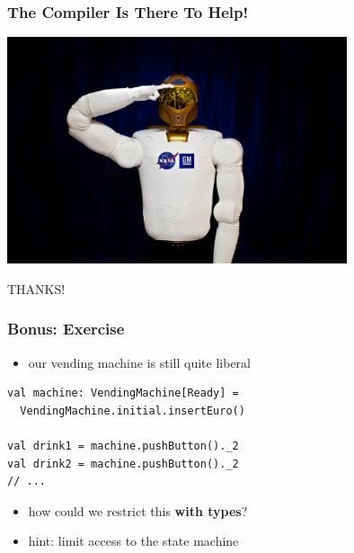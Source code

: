 \documentclass{beamer}
\begin{document}
\begin{frame}
  \frametitle{The Compiler Is There To Help!}
  \begin{center}
    \includegraphics[width=0.75\textwidth]{../pics/robot.jpg}
  \end{center}

  \vfill
  \begin{center}
    {\Huge THANKS!}
  \end{center}
\end{frame}

\begin{frame}[fragile]
  \frametitle{Bonus: Exercise}
  \begin{itemize}
  \item our vending machine is still quite liberal
  \end{itemize}

\begin{verbatim}
val machine: VendingMachine[Ready] = 
  VendingMachine.initial.insertEuro()

val drink1 = machine.pushButton()._2
val drink2 = machine.pushButton()._2
// ...
\end{verbatim}
    \begin{itemize}
    \item how could we restrict this \textbf{with types}?
    \item hint: limit access to the state machine
  \end{itemize}
\end{frame}
\end{document}
